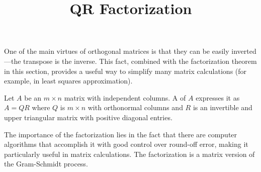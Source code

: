 \documentclass{ximera}
\title{QR Factorization} \license{CC BY-NC-SA 4.0}
\begin{document}
\begin{abstract}

\end{abstract}
\maketitle

One of the main virtues of orthogonal
matrices is that they can be easily inverted---the transpose is the
inverse. This fact, combined with the factorization theorem in this
section, provides a useful way to simplify many matrix calculations (for
 example, in least squares approximation).


\begin{definition}\label{def:QR-factorization}
Let $A$ be an $m \times n$ matrix with independent columns. A  of $A$ expresses it as $A = QR$ where $Q$ is $m \times n$ with orthonormal columns and $R$ is an invertible and upper triangular matrix with positive diagonal entries.
\end{definition}

The importance of the factorization
lies in the fact that there are computer algorithms that accomplish it
with good control over round-off error, making it particularly useful in
 matrix calculations. The factorization is a matrix version of the Gram-Schmidt process.
\end{document}
